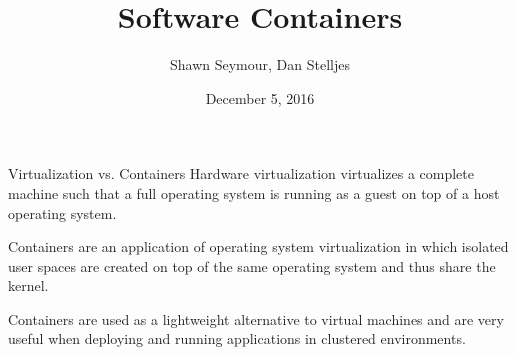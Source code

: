 \documentclass[xcolor=dvipsnames,aspectratio=1610]{beamer}
\title{Software Containers}
\date{December 5, 2016}
\author{Shawn Seymour, Dan Stelljes}
\begin{document}
  \maketitle
  \begin{frame}{Virtualization vs. Containers}
      Hardware virtualization virtualizes a complete machine such that a full operating system is running as a guest on top of a host operating system. \newline

      Containers are an application of operating system virtualization in which isolated user spaces are created on top of the same operating system and thus share the kernel. \newline

      Containers are used as a lightweight alternative to virtual machines and are very useful when deploying and running applications in clustered environments.
  \end{frame}
\end{document}
